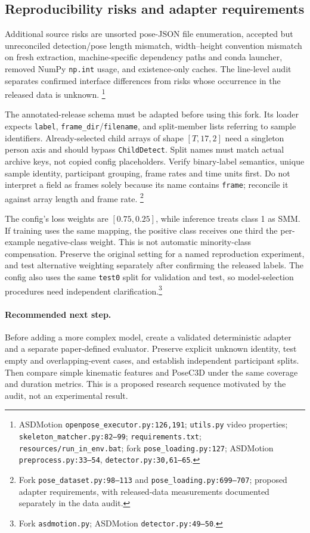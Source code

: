 \subsection{Reproducibility risks and adapter requirements}
Additional source risks are unsorted pose-JSON file enumeration, accepted
but unreconciled detection/pose length mismatch, width--height convention
mismatch on fresh extraction, machine-specific dependency paths and conda
launcher, removed NumPy \texttt{np.int} usage, and existence-only caches.
The line-level audit separates confirmed interface differences from risks
whose occurrence in the released data is unknown.
\footnote{ASDMotion \texttt{openpose\_executor.py:126,191};
\texttt{utils.py} video properties;
\texttt{skeleton\_matcher.py:82--99}; \texttt{requirements.txt};
\texttt{resources/run\_in\_env.bat}; fork
\texttt{pose\_loading.py:127}; ASDMotion
\texttt{preprocess.py:33--54}, \texttt{detector.py:30,61--65}.}

The annotated-release schema must be adapted before using this fork.
Its loader expects \texttt{label}, \texttt{frame\_dir}/\texttt{filename},
and split-member lists referring to sample identifiers. Already-selected
child arrays of shape $[T,17,2]$ need a singleton person axis and should
bypass \texttt{ChildDetect}. Split names must match actual archive keys,
not copied config placeholders. Verify binary-label semantics, unique
sample identity, participant grouping, frame rates and time units first.
Do not interpret a field as frames solely because its name contains
\texttt{frame}; reconcile it against array length and frame rate.
\footnote{Fork \texttt{pose\_dataset.py:98--113} and
\texttt{pose\_loading.py:699--707}; proposed adapter requirements, with
released-data measurements documented separately in the data audit.}

The config's loss weights are $[0.75,0.25]$, while inference treats class
1 as SMM. If training uses the same mapping, the positive class receives
one third the per-example negative-class weight. This is not automatic
minority-class compensation. Preserve the original setting for a named
reproduction experiment, and test alternative weighting separately after
confirming the released labels. The config also uses the same
\texttt{test0} split for validation and test, so model-selection procedures
need independent clarification.\footnote{Fork \texttt{asdmotion.py};
ASDMotion \texttt{detector.py:49--50}.}

\paragraph{Recommended next step.}
Before adding a more complex model, create a validated deterministic
adapter and a separate paper-defined evaluator. Preserve explicit unknown
identity, test empty and overlapping-event cases, and establish independent
participant splits. Then compare simple kinematic features and PoseC3D
under the same coverage and duration metrics. This is a proposed research
sequence motivated by the audit, not an experimental result.
